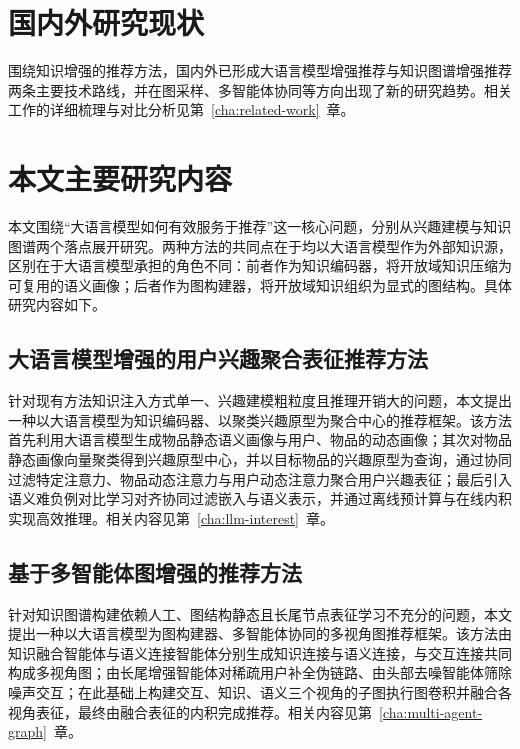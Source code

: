 
\section{国内外研究现状}
\label{sec:related-work-brief}

围绕知识增强的推荐方法，国内外已形成大语言模型增强推荐与知识图谱增强推荐两条主要技术路线，并在图采样、多智能体协同等方向出现了新的研究趋势。相关工作的详细梳理与对比分析见第~\ref{cha:related-work}~章。

\section{本文主要研究内容}
\label{sec:content}

本文围绕“大语言模型如何有效服务于推荐”这一核心问题，分别从兴趣建模与知识图谱两个落点展开研究。两种方法的共同点在于均以大语言模型作为外部知识源，区别在于大语言模型承担的角色不同：前者作为知识编码器，将开放域知识压缩为可复用的语义画像；后者作为图构建器，将开放域知识组织为显式的图结构。具体研究内容如下。

\subsection{大语言模型增强的用户兴趣聚合表征推荐方法}
\label{subsec:content-llm}

针对现有方法知识注入方式单一、兴趣建模粗粒度且推理开销大的问题，本文提出一种以大语言模型为知识编码器、以聚类兴趣原型为聚合中心的推荐框架。该方法首先利用大语言模型生成物品静态语义画像与用户、物品的动态画像；其次对物品静态画像向量聚类得到兴趣原型中心，并以目标物品的兴趣原型为查询，通过协同过滤特定注意力、物品动态注意力与用户动态注意力聚合用户兴趣表征；最后引入语义难负例对比学习对齐协同过滤嵌入与语义表示，并通过离线预计算与在线内积实现高效推理。相关内容见第~\ref{cha:llm-interest}~章。

\subsection{基于多智能体图增强的推荐方法}
\label{subsec:content-graph}

针对知识图谱构建依赖人工、图结构静态且长尾节点表征学习不充分的问题，本文提出一种以大语言模型为图构建器、多智能体协同的多视角图推荐框架。该方法由知识融合智能体与语义连接智能体分别生成知识连接与语义连接，与交互连接共同构成多视角图；由长尾增强智能体对稀疏用户补全伪链路、由头部去噪智能体筛除噪声交互；在此基础上构建交互、知识、语义三个视角的子图执行图卷积并融合各视角表征，最终由融合表征的内积完成推荐。相关内容见第~\ref{cha:multi-agent-graph}~章。

